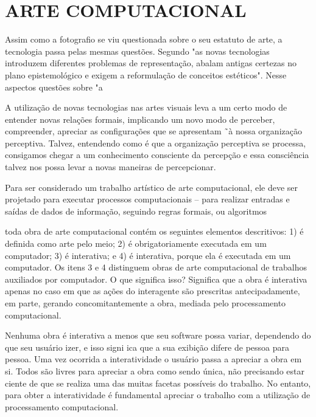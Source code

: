 \chapter{ARTE COMPUTACIONAL}

Assim como a fotografio se viu questionada sobre o seu estatuto de arte, a tecnologia passa pelas mesmas questões. Segundo  "as novas tecnologias introduzem diferentes problemas de representação, abalam antigas certezas no plano epistemológico e exigem a reformulação de conceitos estéticos". Nesse aspectos questões sobre "a
								
A utilização de novas tecnologias nas artes visuais leva a um certo modo de entender novas relações formais, implicando um novo modo de perceber, compreender, apreciar as configurações que se apresentam ˜à nossa organização perceptiva. Talvez, entendendo como é que a organização perceptiva se processa, consigamos chegar a um conhecimento consciente da percepção e essa consciência talvez nos possa levar a novas maneiras de percepcionar. \cite[p. 55]{azevedo}

Para ser considerado um trabalho artístico de arte computacional, ele deve ser projetado para executar processos computacionais – para realizar entradas e saídas de dados de informação, seguindo regras formais, ou algoritmos \cite[p. 132]{venturelli}

toda obra de arte computacional contém os seguintes elementos descritivos: 1) é definida como arte pelo meio; 2) é obrigatoriamente executada em um computador; 3) é interativa; e 4) é interativa, porque ela é executada em um computador. Os itens 3 e 4 distinguem obras de arte computacional de trabalhos auxiliados por computador. O que significa isso? Significa que a obra é interativa apenas no caso em que as ações do interagente são prescritas antecipadamente, em parte, gerando concomitantemente a obra, mediada pelo processamento computacional.  \cite[p. 133]{venturelli}

Nenhuma obra é interativa a menos que seu software possa variar, dependendo do que seu usuário izer, e isso signi ica que a sua exibição difere de pessoa para pessoa. Uma vez ocorrida a interatividade o usuário passa a apreciar a obra em si. Todos são livres para apreciar a obra como sendo única, não precisando estar ciente de que se realiza uma das muitas facetas possíveis do trabalho. No entanto, para obter a interatividade é fundamental apreciar o trabalho com a utilização de processamento computacional.  \cite[p. 138-139]{venturelli}

